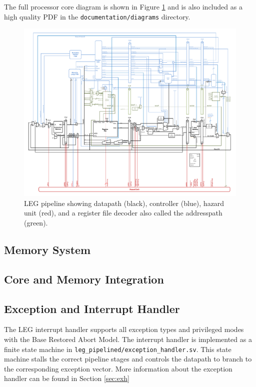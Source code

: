 The full processor core diagram is shown in Figure \ref{fig:pipelinedfull} and is also included as a high quality PDF in the \texttt{documentation/diagrams} directory.

\begin{figure}[h!]
\centering
\includegraphics[width=\textwidth]{./diagrams/pipelinedfull.pdf}
\caption{LEG pipeline showing datapath (black), controller (blue), hazard unit (red), and a register file decoder also called the addresspath (green).}
\label{fig:pipelinedfull}
\end{figure}

\subsection{Memory System}

\subsection{Core and Memory Integration}

\subsection{Exception and Interrupt Handler}

The LEG interrupt handler supports all exception types and privileged modes with the Base Restored Abort Model.
The interrupt handler is implemented as a finite state machine in \texttt{leg\_pipelined/exception\_handler.sv}.
This state machine stalls the correct pipeline stages and controls the datapath to branch to the corresponding exception vector.
More information about the exception handler can be found in Section \ref{sec:exh}
